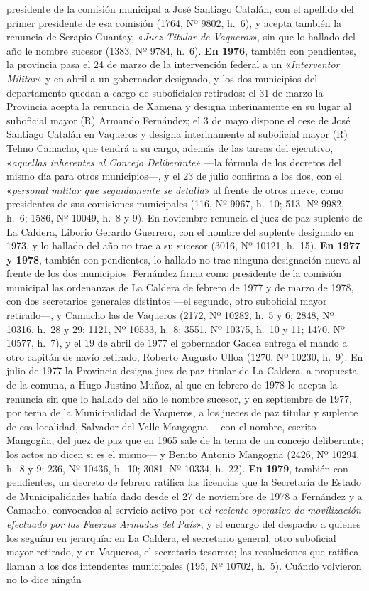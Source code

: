 presidente de la comisión municipal a José Santiago Catalán, con el apellido del primer presidente de esa comisión (1764, Nº 9802, h.\ 6), y acepta también la renuncia de Serapio Guantay, «\textit{Juez Titular de Vaqueros}», sin que lo hallado del año le nombre sucesor (1383, Nº 9784, h.\ 6). \textbf{En 1976}, también con pendientes, la provincia pasa el 24 de marzo de la intervención federal a un «\textit{Interventor Militar}» y en abril a un gobernador designado, y los dos municipios del departamento quedan a cargo de suboficiales retirados: el 31 de marzo la Provincia acepta la renuncia de Xamena y designa interinamente en su lugar al suboficial mayor (R) Armando Fernández; el 3 de mayo dispone el cese de José Santiago Catalán en Vaqueros y designa interinamente al suboficial mayor (R) Telmo Camacho, que tendrá a su cargo, además de las tareas del ejecutivo, «\textit{aquellas inherentes al Concejo Deliberante}» ---la fórmula de los decretos del mismo día para otros municipios---, y el 23 de julio confirma a los dos, con el «\textit{personal militar que seguidamente se detalla}» al frente de otros nueve, como presidentes de sus comisiones municipales (116, Nº 9967, h.\ 10; 513, Nº 9982, h.\ 6; 1586, Nº 10049, h.\ 8 y 9). En noviembre renuncia el juez de paz suplente de La Caldera, Liborio Gerardo Guerrero, con el nombre del suplente designado en 1973, y lo hallado del año no trae a su sucesor (3016, Nº 10121, h.\ 15). \textbf{En 1977 y 1978}, también con pendientes, lo hallado no trae ninguna designación nueva al frente de los dos municipios: Fernández firma como presidente de la comisión municipal las ordenanzas de La Caldera de febrero de 1977 y de marzo de 1978, con dos secretarios generales distintos ---el segundo, otro suboficial mayor retirado---, y Camacho las de Vaqueros (2172, Nº 10282, h.\ 5 y 6; 2848, Nº 10316, h.\ 28 y 29; 1121, Nº 10533, h.\ 8; 3551, Nº 10375, h.\ 10 y 11; 1470, Nº 10577, h.\ 7), y el 19 de abril de 1977 el gobernador Gadea entrega el mando a otro capitán de navío retirado, Roberto Augusto Ulloa (1270, Nº 10230, h.\ 9). En julio de 1977 la Provincia designa juez de paz titular de La Caldera, a propuesta de la comuna, a Hugo Justino Muñoz, al que en febrero de 1978 le acepta la renuncia sin que lo hallado del año le nombre sucesor, y en septiembre de 1977, por terna de la Municipalidad de Vaqueros, a los jueces de paz titular y suplente de esa localidad, Salvador del Valle Mangogna ---con el nombre, escrito Mangogña, del juez de paz que en 1965 sale de la terna de un concejo deliberante; los actos no dicen si es el mismo--- y Benito Antonio Mangogna (2426, Nº 10294, h.\ 8 y 9; 236, Nº 10436, h.\ 10; 3081, Nº 10334, h.\ 22). \textbf{En 1979}, también con pendientes, un decreto de febrero ratifica las licencias que la Secretaría de Estado de Municipalidades había dado desde el 27 de noviembre de 1978 a Fernández y a Camacho, convocados al servicio activo por «\textit{el reciente operativo de movilización efectuado por las Fuerzas Armadas del País}», y el encargo del despacho a quienes los seguían en jerarquía: en La Caldera, el secretario general, otro suboficial mayor retirado, y en Vaqueros, el secretario-tesorero; las resoluciones que ratifica llaman a los dos intendentes municipales (195, Nº 10702, h.\ 5). Cuándo volvieron no lo dice ningún 